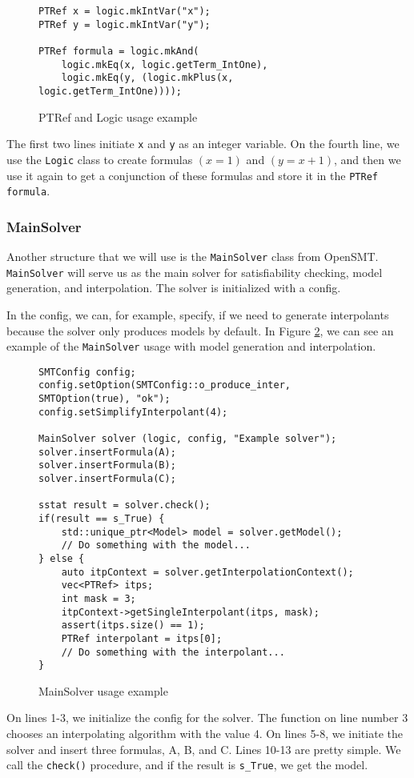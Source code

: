\renewcommand{\figurename}{Figure}
\lstset{style=cppstyle}
\begin{figure}[h]
\begin{lstlisting}
PTRef x = logic.mkIntVar("x");
PTRef y = logic.mkIntVar("y");

PTRef formula = logic.mkAnd(
    logic.mkEq(x, logic.getTerm_IntOne),
    logic.mkEq(y, (logic.mkPlus(x, logic.getTerm_IntOne))));
\end{lstlisting}
\caption{PTRef and Logic usage example}\label{ex:PTref}
\end{figure}
The first two lines initiate \texttt{x} and \texttt{y} as an integer variable. On the fourth line, we use the \texttt{Logic} class to create formulas $(x = 1)$ and $(y = x + 1)$, and then we use it again to get a conjunction of these formulas and store it in the \texttt{PTRef formula}.

\subsubsection{MainSolver}
\noindent Another structure that we will use is the \texttt{MainSolver} class from OpenSMT. \texttt{MainSolver} will serve us as the main solver for satisfiability checking, model generation, and interpolation. The solver is initialized with a config.

In the config, we can, for example, specify, if we need to generate interpolants because the solver only produces models by default. In Figure \ref{ex:MainSolver}, we can see an example of the \texttt{MainSolver} usage with model generation and interpolation.

\begin{figure}[h]
\begin{lstlisting}
SMTConfig config;
config.setOption(SMTConfig::o_produce_inter, SMTOption(true), "ok");
config.setSimplifyInterpolant(4);

MainSolver solver (logic, config, "Example solver");
solver.insertFormula(A);
solver.insertFormula(B);
solver.insertFormula(C);

sstat result = solver.check();
if(result == s_True) {
    std::unique_ptr<Model> model = solver.getModel();
    // Do something with the model...
} else {
    auto itpContext = solver.getInterpolationContext();
    vec<PTRef> itps;
    int mask = 3;
    itpContext->getSingleInterpolant(itps, mask);
    assert(itps.size() == 1);
    PTRef interpolant = itps[0];
    // Do something with the interpolant...
}
\end{lstlisting}
\caption{MainSolver usage example}\label{ex:MainSolver}
\end{figure}
On lines 1-3, we initialize the config for the solver. The function on line number 3 chooses an interpolating algorithm with the value 4. On lines 5-8, we initiate the solver and insert three formulas, A, B, and C. Lines 10-13 are pretty simple. We call the \texttt{check()} procedure, and if the result is \texttt{s\_True}, we get the model.

